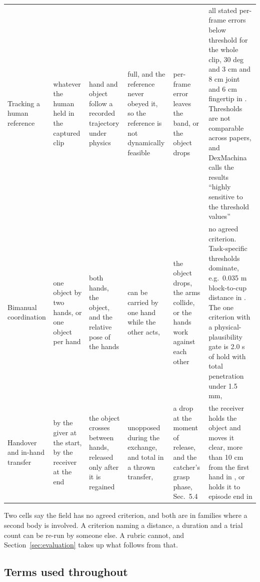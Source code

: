 \begin{table}[!t]
\begin{tabular}{@{}L{0.085\textwidth}L{0.150\textwidth}L{0.150\textwidth}L{0.145\textwidth}L{0.130\textwidth}L{0.240\textwidth}@{}}
    \addlinespace[2.5pt]
    Tracking a human reference &
    whatever the human held in the captured clip &
    hand and object follow a recorded trajectory under physics &
    full, and the reference never obeyed it, so the reference is not dynamically feasible &
    per-frame error leaves the band, or the object drops &
    all stated per-frame errors below threshold for the whole clip, 30 deg and 3 cm and 8 cm joint and 6 cm fingertip in \cite{maniptrans_2025}. Thresholds are not comparable across papers, and DexMachina \cite{dexmachina_2025} calls the results ``highly sensitive to the threshold values'' \\
    \addlinespace[2.5pt]
    Bimanual coordination &
    one object by two hands, or one object per hand &
    both hands, the object, and the relative pose of the hands &
    can be carried by one hand while the other acts, \cite{asymdex_2024} &
    the object drops, the arms collide, or the hands work against each other &
    no agreed criterion. Task-specific thresholds dominate, e.g.\ 0.035 m block-to-cup distance in \cite{asymdex_2024}. The one criterion with a physical-plausibility gate is 2.0 s of hold with total penetration under 1.5 mm, \cite{bimangrasp_2024} \\
    \addlinespace[2.5pt]
    Handover and in-hand transfer &
    by the giver at the start, by the receiver at the end &
    the object crosses between hands, released only after it is regained &
    unopposed during the exchange, and total in a thrown transfer, \cite{dynamic_handover_2023} &
    a drop at the moment of release, and the catcher's grasp phase, \cite{dynamic_handover_2023} Sec.~5.4 &
    the receiver holds the object and moves it clear, more than 10 cm from the first hand in \cite{hato_visuotactile_2024}, or holds it to episode end in \cite{dydexhandover_2025} \\
    \bottomrule
  \end{tabular}
\end{table}

Two cells say the field has no agreed criterion, and both are in families where a second body is
involved. A criterion naming a distance, a duration and a trial count can be re-run by someone
else. A rubric cannot, and Section~\ref{sec:evaluation} takes up what follows from that.

\subsection{Terms used throughout}
\label{subsec:terms}


